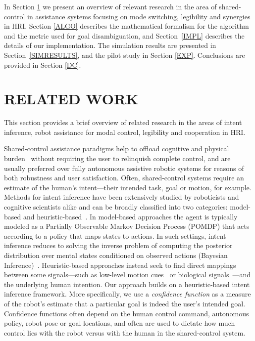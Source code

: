 \documentclass[conference]{IEEEtran}
\begin{document}
In Section \ref{RW} we present an overview of relevant research in the area of shared-control in assistance systems focusing on mode switching, legibility and synergies in HRI. Section \ref{ALGO} describes the mathematical formalism for the algorithm and the metric used for goal disambiguation, and Section~\ref{IMPL} describes the details of our implementation. The simulation results are presented in Section~\ref{SIMRESULTS}, and the pilot study in Section \ref{EXP}. Conclusions are provided in Section \ref{DC}.

\section{RELATED WORK}\label{RW} 

This section provides a brief overview of related research in the areas of intent inference, robot assistance for modal control, legibility and cooperation in HRI.

Shared-control assistance paradigms help to offload cognitive and physical burden~\cite{volosyak2005rehabilitation} without requiring the user to relinquish complete control, and are usually preferred over fully autonomous assistive robotic systems for reasons of both robustness and user satisfaction. Often, shared-control systems require an estimate of the human's intent---their intended task, goal or motion, for example. Methods for intent inference have been extensively studied by roboticists and cognitive scientists alike and can be broadly classified into two categories: model-based and heuristic-based~\cite{baker2017rational}. In model-based approaches the agent is typically modeled as a Partially Observable Markov Decision Process (POMDP) that acts according to a policy that maps states to actions. In such settings, intent inference reduces to solving the inverse problem of computing the posterior distribution over mental states conditioned on observed actions (Bayesian Inference)~\cite{baker2007goal,baker2009action}. Heuristic-based approaches instead seek to find direct mappings between some signals---such as low-level motion cues~\cite{barrett2005accurate} or biological signals~\cite{donoghue2002connecting}---and the underlying human intention. Our approach builds on a heuristic-based intent inference framework. More specifically, we use a \textit{confidence function} as a measure of the robot's estimate that a particular goal is indeed the user's intended goal. Confidence functions often depend on the human control command, autonomous policy, robot pose or goal locations, and often are used to dictate how much control lies with the robot versus with the human in the shared-control system. 
\end{document}
